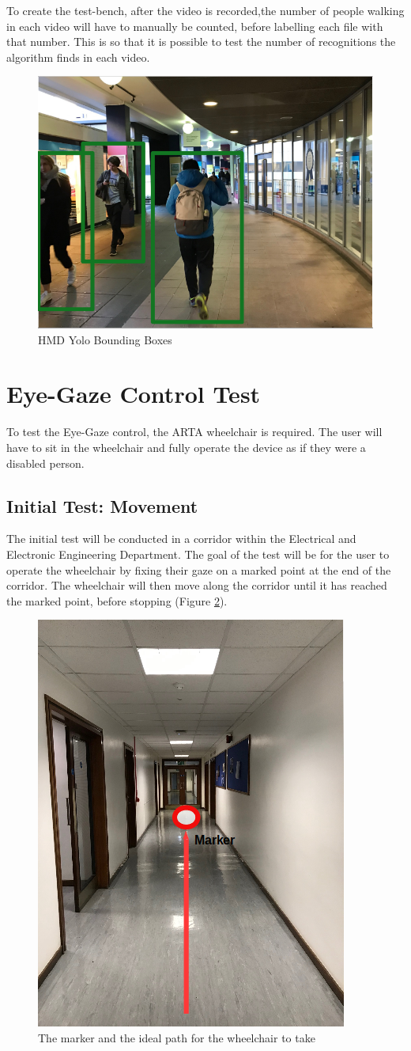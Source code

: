\documentclass[12pt,a4paper]{report}
\begin{document}
To create the test-bench, after the video is recorded,the number of people walking in each video will have to manually be counted, before labelling each file with that number. This is so that it is possible to test the number of recognitions the algorithm finds in each video.

\begin{figure}[ht!]
	\begin{center}
		\includegraphics[width=.35\linewidth]{Images/Evaluation/HumanDetection/bounding_boxes.png}
		\caption{HMD Yolo Bounding Boxes}
		\label{fig:HMD_Yolo_Bounding}
	\end{center}
\end{figure}

\section{Eye-Gaze Control Test}
To test the Eye-Gaze control, the ARTA wheelchair is required. The user will have to sit in the wheelchair and fully operate the device as if they were a disabled person. 

\subsection{Initial Test: Movement}
The initial test will be conducted in a corridor within the Electrical and Electronic Engineering Department. The goal of the test will be for the user to operate the wheelchair by fixing their gaze on a marked point at the end of the corridor. The wheelchair will then move along the corridor until it has reached the marked point, before stopping (Figure \ref{fig:EyeGaze_Initial_Test}).

\begin{figure}[ht!]
	\begin{center}
		\includegraphics[width=.3\linewidth]{Images/Evaluation/EyeGaze/Initial_Test.png}
		\caption{The marker and the ideal path for the wheelchair to take}
		\label{fig:EyeGaze_Initial_Test}
	\end{center}
\end{figure}
\end{document}
